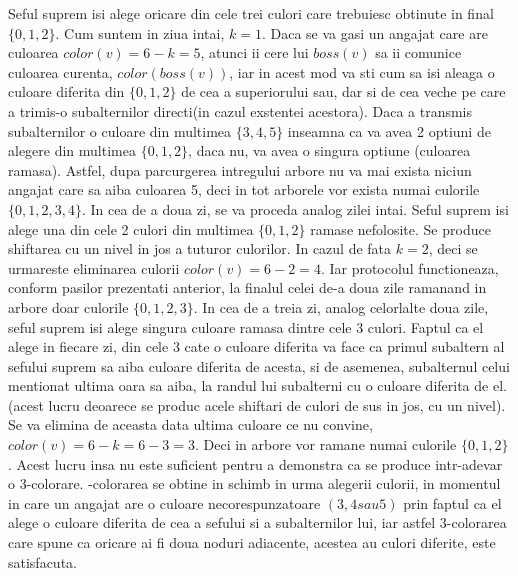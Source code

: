 \documentclass{article}
\begin{document}
\newline
\newline
Seful suprem isi alege oricare din cele trei culori care trebuiesc obtinute in final $\{0,1,2\}$. Cum suntem in ziua  intai, $k=1$. Daca se va gasi un angajat care are culoarea $color(v)=6-k=5$, atunci ii cere lui $boss(v)$ sa ii comunice culoarea curenta, $color(boss(v))$, iar in acest mod va sti cum sa isi aleaga o culoare diferita  din $\{0,1,2\}$ de cea a superiorului sau, dar si de cea veche pe care a trimis-o subalternilor directi(in cazul exstentei acestora). Daca a transmis subalternilor o culoare din multimea $\{3,4,5\}$ inseamna ca va avea 2 optiuni de alegere din multimea $\{0,1,2\}$, daca nu, va avea o singura optiune (culoarea ramasa).
\newline
\newline
Astfel, dupa parcurgerea intregului arbore nu va mai exista niciun angajat care sa aiba culoarea 5, deci in tot arborele vor exista numai culorile $\{0,1,2,3,4\}$.
\newline
\newline
In cea de a doua zi, se va proceda analog zilei intai. Seful suprem isi alege una din cele 2 culori din multimea $\{0,1,2\}$ ramase nefolosite. Se produce shiftarea cu un nivel in jos a tuturor culorilor. In cazul de fata $k=2$, deci se urmareste eliminarea culorii $color(v)=6-2=4$. Iar protocolul functioneaza, conform pasilor prezentati anterior, la finalul celei de-a doua zile ramanand in arbore doar culorile $\{0,1,2,3\}$.
\newline
\newline
In cea de a treia zi, analog celorlalte doua zile, seful suprem isi alege singura culoare ramasa dintre cele 3 culori. Faptul ca el alege in fiecare zi, din cele 3 cate o culoare diferita va face ca primul subaltern al sefului suprem sa aiba culoare diferita de acesta, si de asemenea, subalternul celui mentionat ultima oara sa aiba, la randul lui subalterni cu o culoare diferita de el. (acest lucru deoarece se produc acele shiftari de culori de sus in jos, cu un nivel). Se va elimina de aceasta data ultima culoare ce nu convine, $color(v)=6-k=6-3=3$. Deci in arbore vor ramane numai culorile $\{0,1,2\}$. Acest lucru insa nu este suficient pentru a demonstra ca se produce intr-adevar o 3-colorare. 
\newline
{}-colorarea se obtine in schimb in urma alegerii culorii, in momentul in care un angajat are o culoare necorespunzatoare $(3,4 sau 5)$ prin faptul ca el alege o culoare diferita de cea a sefului si a subalternilor lui, iar astfel 3-colorarea care spune ca oricare ai fi doua noduri adiacente, acestea au culori diferite, este satisfacuta. 
\end{document}
